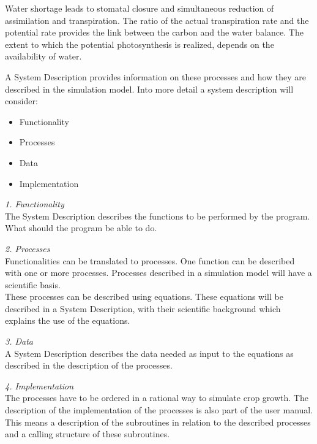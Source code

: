 Water shortage leads to stomatal closure and simultaneous reduction of assimilation
and transpiration. The ratio of the actual transpiration rate and the potential rate
provides the link between the carbon and the water balance. The extent to which the
potential photosynthesis is realized, depends on the availability of water.

A System Description provides information on these processes and how they are
described in the simulation model. Into more detail a system description will 
consider:
\begin{itemize}
\item Functionality
\item Processes
\item Data
\item Implementation
\end{itemize}

{\it 1. Functionality}\\
The System Description describes the functions to be performed by the program.
What should the program be able to do. 

{\it 2. Processes}\\
Functionalities can be translated to processes. One function can be described with
one or more processes. Processes described in a simulation model will have a
scientific basis.\\
These processes can be described using equations. These equations will be described
in a System Description, with their scientific background which explains the use of the
equations. 

{\it 3. Data}\\
A System Description describes the data needed as input to the equations as
described in the description of the processes. 

{\it 4. Implementation}\\
The processes have to be ordered in a rational way to simulate crop growth. The
description of the implementation of the processes is also part of the user manual.
This means a description of the subroutines in relation to the described processes and
a calling structure of these subroutines.  

